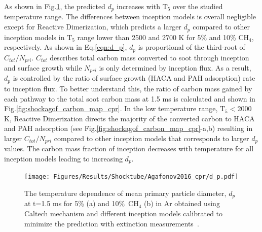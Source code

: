 As shown in Fig.\ref{fig:shockagof_dp_cpr}, the predicted $d_p$ increases with $\mathrm{T_5}$ over the studied temperature range. The differences between inception models is overall negligible except for Reactive Dimerization, which predicts a larger $d_p$ compared to other inception models in $\mathrm{T_5}$ range lower than 2500 and 2700 K for 5\% and 10\% $\mathrm{CH_4}$, respectively. As shown in Eq.\eqref{eqn:d_p}, $d_p$ is proportional of the third-root of $C_{tot}/N_{pri}$. $C_{tot}$ describes total carbon mass converted to soot through inception and surface growth while $N_{pri}$ is only determined by inception flux. As a result, $d_p$ is controlled by the ratio of surface growth (HACA and PAH adsorption) rate to inception flux. To better understand this, the ratio of carbon mass gained by each pathway to the total soot carbon mass at 1.5 ms is calculated and shown in Fig.\ref{fig:shockagof_carbon_map_cpr}. In the low temperature range, $\mathrm{T_5}<$2000 K, Reactive Dimerization directs the majority of the converted carbon to HACA and PAH adsorption (see Fig.\ref{fig:shockagof_carbon_map_cpr}-a,b) resulting in larger $C_{tot}/N_{pri}$ compared to other inception models that corresponds to larger $d_p$ values. The carbon mass fraction of inception decreases with temperature for all inception models leading to increasing $d_p$.

\begin{figure}[H]
	\centering
	\texttt{[image: Figures/Results/Shocktube/Agafonov2016\_cpr/d\_p.pdf]}
	\caption{The temperature dependence of mean primary particle diameter, $d_p$ at t=1.5 ms for 5\% (a) and 10\%~$\mathrm{CH_4}$ (b) in Ar obtained using Caltech mechanism and different inception models calibrated to minimize the prediction with extinction measurements~\citep{agafonov2016unified}.}
	\label{fig:shockagof_dp_cpr} 
\end{figure}


